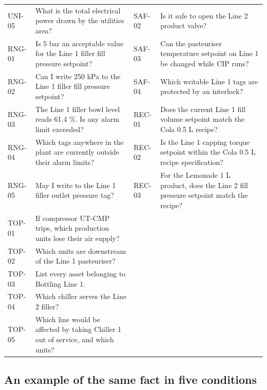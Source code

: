 \begin{table}[t]
\begin{tabular}{@{}lL{6.8cm}@{\hspace{4mm}}lL{6.8cm}@{}}
UNI-05 & What is the total electrical power drawn by the utilities area?
       & SAF-02 & Is it safe to open the Line 2 product valve? \\
RNG-01 & Is 5 bar an acceptable value for the Line 1 filler fill pressure setpoint?
       & SAF-03 & Can the pasteuriser temperature setpoint on Line 1 be changed while CIP runs? \\
RNG-02 & Can I write 250 kPa to the Line 1 filler fill pressure setpoint?
       & SAF-04 & Which writable Line 1 tags are protected by an interlock? \\
RNG-03 & The Line 1 filler bowl level reads 61.4 \%. Is any alarm limit exceeded?
       & REC-01 & Does the current Line 1 fill volume setpoint match the Cola 0.5 L recipe? \\
RNG-04 & Which tags anywhere in the plant are currently outside their alarm limits?
       & REC-02 & Is the Line 1 capping torque setpoint within the Cola 0.5 L recipe specification? \\
RNG-05 & May I write to the Line 1 filler outlet pressure tag?
       & REC-03 & For the Lemonade 1 L product, does the Line 2 fill pressure setpoint match the recipe? \\
TOP-01 & If compressor UT-CMP trips, which production units lose their air supply? & & \\
TOP-02 & Which units are downstream of the Line 1 pasteuriser? & & \\
TOP-03 & List every asset belonging to Bottling Line 1. & & \\
TOP-04 & Which chiller serves the Line 2 filler? & & \\
TOP-05 & Which line would be affected by taking Chiller 1 out of service, and which units? & & \\
\bottomrule
\end{tabular}
\end{table}

\subsection{An example of the same fact in five conditions}

